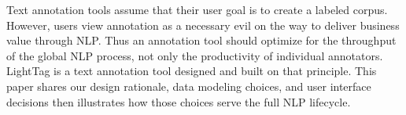 Text annotation tools assume that their user goal  is  to  create  a  labeled  corpus.   However, users  view  annotation  as  a  necessary  evil  on the way to deliver business value through NLP. Thus  an  annotation  tool  should  optimize  for the throughput of the global NLP process, not only the productivity of individual annotators. LightTag is a text annotation tool designed and built on that principle.  This paper shares our design  rationale,  data  modeling  choices,  and user  interface  decisions  then  illustrates  how those choices serve the full NLP lifecycle.